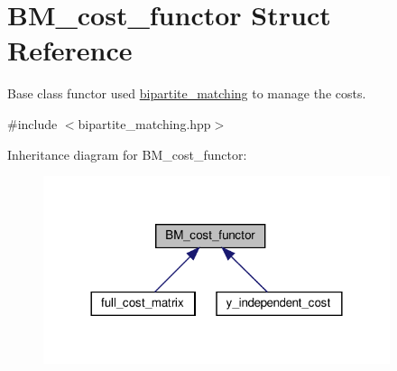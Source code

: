 \hypertarget{structBM__cost__functor}{}\section{B\+M\+\_\+cost\+\_\+functor Struct Reference}
\label{structBM__cost__functor}


Base class functor used \hyperlink{classbipartite__matching}{bipartite\+\_\+matching} to manage the costs.  




{\ttfamily \#include $<$bipartite\+\_\+matching.\+hpp$>$}



Inheritance diagram for B\+M\+\_\+cost\+\_\+functor\+:
\nopagebreak
\begin{figure}[H]
\begin{center}
\leavevmode
\includegraphics[width=288pt]{d7/d5e/structBM__cost__functor__inherit__graph}
\end{center}
\end{figure}
